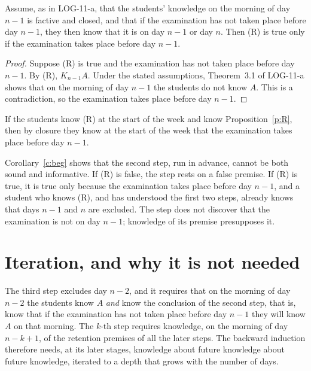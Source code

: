 \documentclass{situationist-preprint}
\begin{document}
\begin{proposition}\label{p:R}
Assume, as in LOG-11-a, that the students' knowledge on the morning of day $n-1$ is factive and closed, and that if the examination has not taken place before day $n-1$, they then know that it is on day $n-1$ or day $n$. Then (R) is true only if the examination takes place before day $n-1$.
\end{proposition}

\begin{proof}
Suppose (R) is true and the examination has not taken place before day $n-1$. By (R), $K_{n-1} A$. Under the stated assumptions, Theorem~3.1 of LOG-11-a shows that on the morning of day $n-1$ the students do not know $A$. This is a contradiction, so the examination takes place before day $n-1$.
\end{proof}

\begin{corollary}\label{c:beg}
If the students know (R) at the start of the week and know Proposition~\ref{p:R}, then by closure they know at the start of the week that the examination takes place before day $n-1$.
\end{corollary}

Corollary~\ref{c:beg} shows that the second step, run in advance, cannot be both sound and informative. If (R) is false, the step rests on a false premise. If (R) is true, it is true only because the examination takes place before day $n-1$, and a student who knows (R), and has understood the first two steps, already knows that days $n-1$ and $n$ are excluded. The step does not discover that the examination is not on day $n-1$; knowledge of its premise presupposes it.

\section{Iteration, and why it is not needed}

The third step excludes day $n-2$, and it requires that on the morning of day $n-2$ the students know $A$ \emph{and} know the conclusion of the second step, that is, know that if the examination has not taken place before day $n-1$ they will know $A$ on that morning. The $k$-th step requires knowledge, on the morning of day $n-k+1$, of the retention premises of all the later steps. The backward induction therefore needs, at its later stages, knowledge about future knowledge about future knowledge, iterated to a depth that grows with the number of days.
\end{document}
